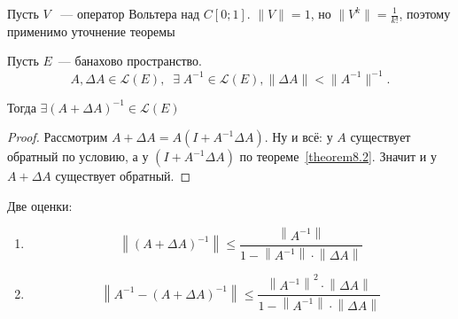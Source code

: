 \begin{example}
    Пусть $V$ ~--- оператор Вольтера над $C[0;1]$. $\|V\|=1$, но $\|V^k\|=\frac 1 {k!}$, поэтому применимо уточнение теоремы
\end{example}

\begin{theorem}[8.3]\label{theorem8.3}
Пусть $E$~--- банахово пространство. \[A, \Delta A \in \mathcal{L}(E),\;\; \exists \; A^{-1} \in \mathcal{L}(E), \|\Delta A\| < \|A^{-1}\|^{-1}.\]

Тогда $\exists (A + \Delta A)^{-1} \in \mathcal{L}(E)$
\end{theorem}

\begin{proof} 
    Рассмотрим $A + \Delta A = A (I + A^{-1} \Delta A)$. Ну и всё: у $A$ существует обратный по условию, а у $(I + A^{-1} \Delta A)$ по теореме~\ref{theorem8.2}. Значит и у $A+\Delta A$ существует обратный.
\end{proof}

\begin{statement}\label{theorem8.3_statement}
Две оценки:\\
\begin{enumerate}
    \item
    \[ \left\|(A+\Delta A)^{-1} \right\| \leqslant \frac{ \left\|A^{-1} \right\|}{1- \left\|A^{-1} \right\| \cdot \left\|\Delta A \right\|} \]

    \item 
    \[
    \left\|A^{-1} - (A + \Delta A)^{-1} \right\| \leqslant 
    \frac{ \left\|A^{-1} \right\|^2 \cdot \left\|\Delta A \right\|}{1 - \left\|A^{-1} \right\| \cdot \left\|\Delta A \right\|}
    \]
\end{enumerate}
\end{statement}

